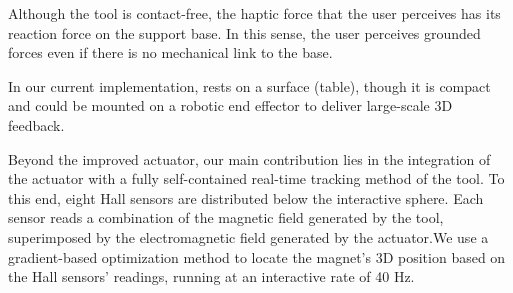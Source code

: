 Although the tool is contact-free, the haptic force that the user perceives has its reaction force on the support base. In this sense, the user perceives grounded forces even if there is no mechanical link to the base.

In our current implementation, \omniUIST rests on a surface (\eg table), though it is compact and could be mounted on a robotic end effector to deliver large-scale 3D feedback. 

Beyond the improved actuator, our main contribution lies in the integration of the \omniUIST actuator with a fully self-contained real-time tracking method of the tool. To this end, eight Hall sensors are distributed below the interactive sphere. Each sensor reads a combination of the magnetic field generated by the tool, superimposed by the electromagnetic field generated by the actuator.We use a gradient-based optimization method to locate the magnet's 3D position based on the Hall sensors' readings, running at an interactive rate of 40 Hz.

